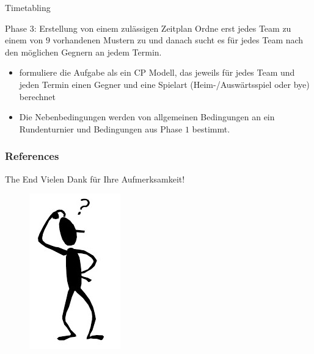 \documentclass[hyperref={pdfpagelabels=false}]{beamer}
\begin{document}
\begin{frame}[allowframebreaks]{Timetabling}
\begin{block}{Phase $3$: Erstellung von einem zulässigen Zeitplan}
Ordne erst jedes Team zu einem von $9$ vorhandenen Mustern zu und danach sucht es für jedes Team nach den möglichen Gegnern an jedem Termin.

\begin{itemize}
\item formuliere die Aufgabe als ein CP Modell, das jeweils für jedes Team und jeden Termin einen Gegner und eine Spielart (Heim-/Auswärtsspiel oder bye) berechnet
\item Die Nebenbedingungen werden von allgemeinen Bedingungen an ein Rundenturnier und Bedingungen aus Phase $1$ bestimmt.
\end{itemize}
\end{block}

\end{frame}

\begin{frame}[allowframebreaks]
	\frametitle{References}
	
	
\end{frame}

\begin{frame}{The End}
\centering
\LARGE
\color{red}
 Vielen Dank für Ihre Aufmerksamkeit!
 \nocite{BeamerTheme}
\end{frame}

\begin{frame}
\centering
\begin{figure}
	\includegraphics{who.png}
\end{figure}
\end{frame}
\end{document}
